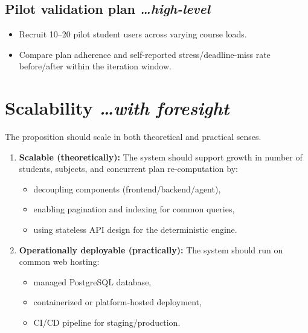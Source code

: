 \documentclass[11pt,a4paper]{article}
\newcommand{\BvrHint}[1]{%
  {\normalfont\normalsize\itshape\hfill #1}}
\begin{document}
\subsection{Pilot validation plan %
\BvrHint{\ldots high-level}}
\begin{itemize}[leftmargin=0.7cm]
    \item Recruit 10--20 pilot student users across varying course loads.
    \item Compare plan adherence and self-reported stress/deadline-miss rate before/after within the iteration window.
\end{itemize}

\section{Scalability %
\BvrHint{\ldots with foresight}}
The proposition should scale in both theoretical and practical
senses.

\begin{enumerate}[leftmargin=0.7cm]
    \item \textbf{Scalable (theoretically):} The system should support growth in number of students, subjects, and concurrent plan re-computation by:
    \begin{itemize}[leftmargin=0.7cm]
        \item decoupling components (frontend/backend/agent),
        \item enabling pagination and indexing for common queries,
        \item using stateless API design for the deterministic engine.
    \end{itemize}

    \item \textbf{Operationally deployable (practically):} The system should run on common web hosting:
    \begin{itemize}[leftmargin=0.7cm]
        \item managed PostgreSQL database,
        \item containerized or platform-hosted deployment,
        \item CI/CD pipeline for staging/production.
    \end{itemize}
\end{enumerate}
\end{document}
